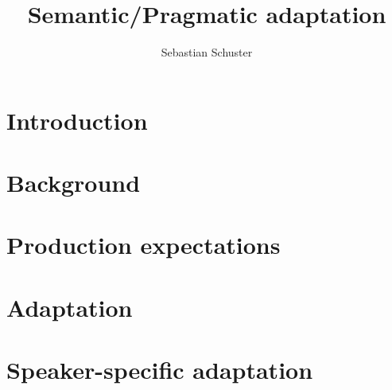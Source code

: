 \documentclass[12pt]{report}
\title{Semantic/Pragmatic adaptation}
\author{Sebastian Schuster}
\begin{document}

    \beforepreface



    

    


    \afterpreface
 
    \chapter{Introduction}
    

    \chapter{Background}
    

    \chapter{Production expectations}
    

    \chapter{Adaptation}
    

    \chapter{Speaker-specific adaptation}
    
\end{document}
